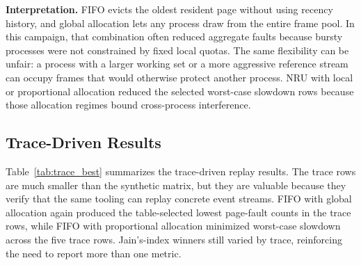 \documentclass[conference]{IEEEtran}
\begin{document}
\textbf{Interpretation.} FIFO evicts the oldest resident page without using recency history, and global allocation lets any process draw from the entire frame pool. In this campaign, that combination often reduced aggregate faults because bursty processes were not constrained by fixed local quotas. The same flexibility can be unfair: a process with a larger working set or a more aggressive reference stream can occupy frames that would otherwise protect another process. NRU with local or proportional allocation reduced the selected worst-case slowdown rows because those allocation regimes bound cross-process interference.

\subsection{Trace-Driven Results}
Table~\ref{tab:trace_best} summarizes the trace-driven replay results. The trace rows are much smaller than the synthetic matrix, but they are valuable because they verify that the same tooling can replay concrete event streams. FIFO with global allocation again produced the table-selected lowest page-fault counts in the trace rows, while FIFO with proportional allocation minimized worst-case slowdown across the five trace rows. Jain's-index winners still varied by trace, reinforcing the need to report more than one metric.

\begin{table}[t]
\centering
\small
\caption{Headline results by trace workload.}
\label{tab:trace_best}
\end{table}
\end{document}
